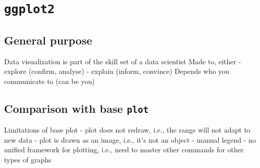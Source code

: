 \documentclass[]{book}
\theoremstyle{definition}
\theoremstyle{definition}
\theoremstyle{definition}
\theoremstyle{remark}
\begin{document}
\hypertarget{ggplot2}{%
\chapter{\texorpdfstring{\texttt{ggplot2}}{ggplot2}}\label{ggplot2}}

\hypertarget{general-purpose}{%
\section{General purpose}\label{general-purpose}}

Data visualization is part of the skill set of a data scientist Made to,
either - explore (confirm, analyse) - explain (inform, convince) Depends
who you communicate to (can be you)

\hypertarget{comparison-with-base-plot}{%
\section{\texorpdfstring{Comparison with base
\texttt{plot}}{Comparison with base plot}}\label{comparison-with-base-plot}}

Limitations of base plot - plot does not redraw, i.e., the range will
not adapt to new data - plot is drawn as an image, i.e., it's not an
object - manual legend - no unified framework for plotting, i.e., need
to master other commands for other types of graphs
\end{document}
